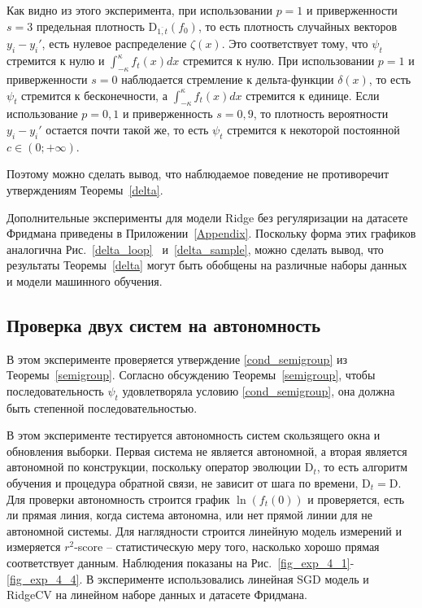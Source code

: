     Как видно из этого эксперимента, при использовании $p = 1$ и приверженности $s = 3$ предельная плотность $\text{D}_{\overline{1, t}}(f_0)$, то есть плотность случайных векторов $y_i - y_i'$, есть нулевое распределение $\zeta(x)$. Это соответствует тому, что $\psi_t$ стремится к нулю и $\int_{-\kappa}^{\kappa}f_t(x)dx$ стремится к нулю.
    При использовании $p = 1$ и приверженности $s = 0$ наблюдается стремление к дельта-функции $\delta(x)$, то есть $\psi_t$ стремится к бесконечности, а $\int_{-\kappa}^{\kappa}f_t(x)dx$ стремится к единице. 
    Если использование $p = 0,1$ и приверженность $s = 0,9$, то плотность вероятности $y_i - y_i'$ остается почти такой же, то есть $\psi_t$ стремится к некоторой постоянной $c \in (0; +\infty)$. 

    Поэтому можно сделать вывод, что наблюдаемое поведение не противоречит утверждениям Теоремы~\ref{delta}.

    Дополнительные эксперименты для модели Ridge без регуляризации на датасете Фридмана приведены в Приложении~\ref{Appendix}. Поскольку форма этих графиков аналогична Рис.~\ref{delta_loop}~ и~\ref{delta_sample}, можно сделать вывод, что результаты Теоремы~\ref{delta} могут быть обобщены на различные наборы данных и модели машинного обучения.

\subsection{Проверка двух систем на автономность} \label{exp_4}

    В этом эксперименте проверяется утверждение \eqref{cond_semigroup} из Теоремы~\ref{semigroup}. Согласно обсуждению Теоремы~\ref{semigroup}, чтобы последовательность $\psi_t$ удовлетворяла условию \eqref{cond_semigroup}, она должна быть степенной последовательностью.

    В этом эксперименте тестируется автономность систем скользящего окна и обновления выборки. Первая система не является автономной, а вторая является автономной по конструкции, поскольку оператор эволюции $\text{D}_t$, то есть алгоритм обучения и процедура обратной связи, не зависит от шага по времени, $\text{D}_t = \text{D}$.
    Для проверки автономность строится график $\ln(f_t(0))$ и проверяется, есть ли прямая линия, когда система автономна, или нет прямой линии для не автономной системы. Для наглядности строится линейную модель измерений и измеряется $r^2$-score -- статистическую меру того, насколько хорошо прямая соответствует данным. Наблюдения показаны на Рис.~\ref{fig_exp_4_1}-\ref{fig_exp_4_4}. В эксперименте использовались линейная SGD модель и RidgeCV на линейном наборе данных и датасете Фридмана.


